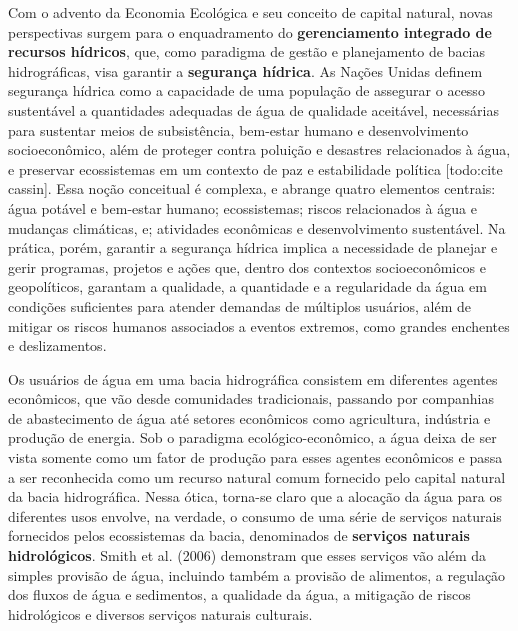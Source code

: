 \documentclass[./main.tex]{subfiles}
\begin{document}
\par Com o advento da Economia Ecológica e seu conceito de capital natural, novas perspectivas surgem para o enquadramento do \textbf{gerenciamento integrado de recursos hídricos}, que, como paradigma de gestão e planejamento de bacias hidrográficas, visa garantir a \textbf{segurança hídrica}. As Nações Unidas definem segurança hídrica como a capacidade de uma população de assegurar o acesso sustentável a quantidades adequadas de água de qualidade aceitável, necessárias para sustentar meios de subsistência, bem-estar humano e desenvolvimento socioeconômico, além de proteger contra poluição e desastres relacionados à água, e preservar ecossistemas em um contexto de paz e estabilidade política [todo:cite cassin]. Essa noção conceitual é complexa, e abrange quatro elementos centrais: água potável e bem-estar humano; ecossistemas; riscos relacionados à água e mudanças climáticas, e; atividades econômicas e desenvolvimento sustentável. Na prática, porém, garantir a segurança hídrica implica a necessidade de planejar e gerir programas, projetos e ações que, dentro dos contextos socioeconômicos e geopolíticos, garantam a qualidade, a quantidade e a regularidade da água em condições suficientes para atender demandas de múltiplos usuários, além de mitigar os riscos humanos associados a eventos extremos, como grandes enchentes e deslizamentos. 

\par Os usuários de água em uma bacia hidrográfica consistem em diferentes agentes econômicos, que vão desde comunidades tradicionais, passando por companhias de abastecimento de água até setores econômicos como agricultura, indústria e produção de energia. Sob o paradigma ecológico-econômico, a água deixa de ser vista somente como um fator de produção para esses agentes econômicos e passa a ser reconhecida como um recurso natural comum fornecido pelo capital natural da bacia hidrográfica. Nessa ótica, torna-se claro que a alocação da água para os diferentes usos envolve, na verdade, o consumo de uma série de serviços naturais fornecidos pelos ecossistemas da bacia, denominados de \textbf{serviços naturais hidrológicos}. Smith et al. (2006) demonstram que esses serviços vão além da simples provisão de água, incluindo também a provisão de alimentos, a regulação dos fluxos de água e sedimentos, a qualidade da água, a mitigação de riscos hidrológicos e diversos serviços naturais culturais\cite{Smith2006a}.
\end{document}
